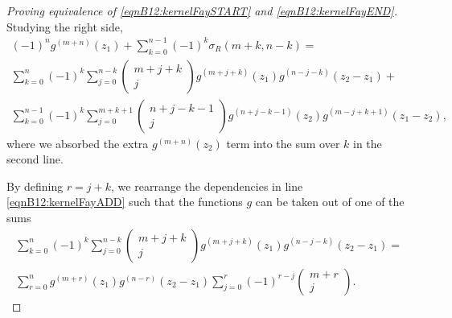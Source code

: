 \begin{proof}[Proving equivalence of \ref{eqnB12:kernelFaySTART} and \ref{eqnB12:kernelFayEND}]
Studying the right side,
\begin{align}
    (-1)^n g^{(m+n)}(z_1) + \sum_{k=0}^{n-1} (-1)^k \sigma_R(m+k,n-k) = \\
    \sum_{k=0}^{n} (-1)^k \sum_{j=0}^{n-k} \begin{pmatrix} m+j+k \\ j \end{pmatrix} g^{(m+j+k)}(z_1) g^{(n-j-k)}(z_2-z_1) + \label{eqnB12:kernelFayADD} \\
    \sum_{k=0}^{n-1} (-1)^k \sum_{j=0}^{m+k+1} \begin{pmatrix} n+j-k-1 \\ j \end{pmatrix} g^{(n+j-k-1)}(z_2) g^{(m-j+k+1)}(z_1-z_2) \label{eqnB12:kernelFaySUB},
\end{align}
where we absorbed the extra $g^{(m+n)}(z_2)$ term into the sum over $k$ in the second line.

By defining $r=j+k$, we rearrange the dependencies in line \ref{eqnB12:kernelFayADD} such that the functions $g$ can be taken out of one of the sums
\begin{align}
    \sum_{k=0}^{n} (-1)^k \sum_{j=0}^{n-k} \begin{pmatrix} m+j+k \\ j \end{pmatrix} g^{(m+j+k)}(z_1) g^{(n-j-k)}(z_2-z_1) = \\
    \sum_{r=0}^{n} g^{(m+r)}(z_1) g^{(n-r)}(z_2-z_1) \sum_{j=0}^{r} (-1)^{r-j} \begin{pmatrix} m+r \\ j \end{pmatrix}.
\end{align}


\end{proof}
